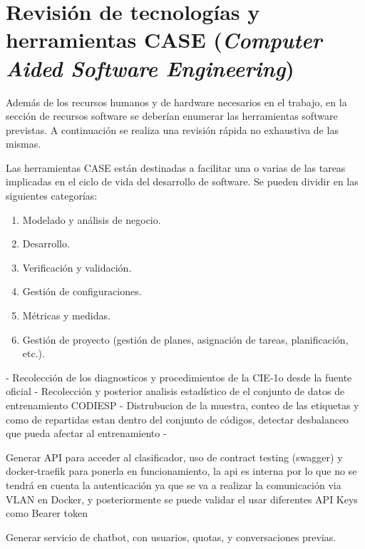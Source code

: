 \section[Tecnologías]{Revisión de tecnologías y herramientas CASE (\emph{Computer Aided Software Engineering})}
Además de los recursos humanos y de hardware necesarios en el trabajo, en la sección de recursos software se deberían enumerar las herramientas software previstas. A continuación se realiza una revisión rápida no exhaustiva de las mismas.

Las herramientas CASE están destinadas a facilitar una o varias de las tareas implicadas en el ciclo de vida del desarrollo de software. Se pueden dividir en las siguientes categorías:

\begin{enumerate}[noitemsep]
\item Modelado y análisis de negocio.
\item Desarrollo. 
\item Verificación y validación.
\item Gestión de configuraciones.
\item Métricas y medidas.
\item Gestión de proyecto (gestión de planes, asignación de tareas, planificación, etc.).
\end{enumerate}

- Recolección de los diagnosticos y procedimientos de la CIE-1o desde la fuente oficial
- Recolección y posterior analisis estadístico de el conjunto de datos de entrenamiento CODIESP
 - Distrubucion de la muestra, conteo de las etiquetas y como de repartidas estan dentro del conjunto de códigos, detectar desbalanceo que pueda afectar al entrenamiento
 - 

 Generar API para acceder al clasificador, uso de contract testing (swagger) y docker-traefik para ponerla en funcionamiento, la api es interna por lo que no se tendrá en cuenta la autenticación ya que se va a realizar la comunicación via VLAN en Docker, y posteriormente se puede validar el usar diferentes API Keys como Bearer token

 Generar servicio de chatbot, con usuarios, quotas, y conversaciones previas.
 

